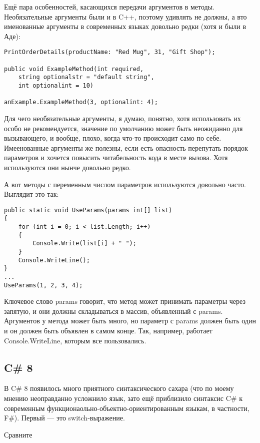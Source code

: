 \documentclass[a5paper]{article}
\begin{document}
Ещё пара особенностей, касающихся передачи аргументов в методы. Необязательные аргументы были и в C++, поэтому удивлять не должны, а вто именованные аргументы в современных языках довольно редки (хотя и были в Аде):

\begin{verbatim}
PrintOrderDetails(productName: "Red Mug", 31, "Gift Shop");

public void ExampleMethod(int required, 
    string optionalstr = "default string",
    int optionalint = 10)

anExample.ExampleMethod(3, optionalint: 4);
\end{verbatim}

Для чего необязательные аргументы, я думаю, понятно, хотя использовать их особо не рекомендуется, значение по умолчанию может быть неожиданно для вызывающего, и вообще, плохо, когда что-то происходит само по себе. Имеенованные аргументы же полезны, если есть опасность перепутать порядок параметров и хочется повысить читабельность кода в месте вызова. Хотя используются они нынче довольно редко.

А вот методы с переменным числом параметров используются довольно часто. Выглядит это так:

\begin{verbatim}
public static void UseParams(params int[] list)
{
    for (int i = 0; i < list.Length; i++)
    {
        Console.Write(list[i] + " ");
    }
    Console.WriteLine();
}
...
UseParams(1, 2, 3, 4);
\end{verbatim}

Ключевое слово params говорит, что метод может принимать параметры через запятую, и они должны складываться в массив, объявленный с params. Аргументов у метода может быть много, но параметр с params должен быть один и он должен быть объявлен в самом конце. Так, например, работает Console.WriteLine, которым все пользовались.

\subsection{C\# 8}

В C\# 8 появилось много приятного синтаксического сахара (что по моему мнению неоправданно усложнило язык, зато ещё приблизило синтаксис C\# к современным функционаольно-объектно-ориентированным языкам, в частности, F\#). Первый --- это switch-выражение.

Сравните
\end{document}

